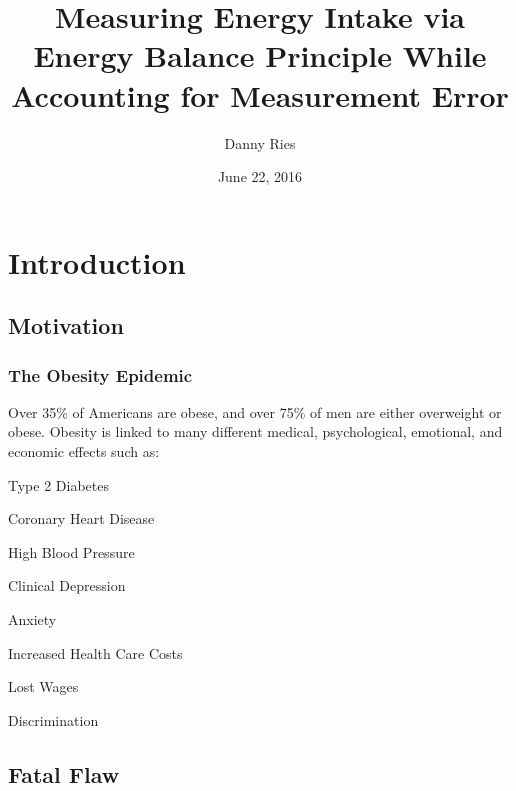 \documentclass[handout]{beamer}\usepackage[]{graphicx}\usepackage[]{color}
\title{Measuring Energy Intake via Energy Balance Principle While Accounting for Measurement Error}
\author[Danny Ries]{Danny Ries}
\institute[Iowa State]{Iowa State University}
\date{June 22, 2016}
\begin{document}







\frame{\maketitle}

\section{Introduction}
\subsection{Motivation}
\begin{frame}
\frametitle{The Obesity Epidemic}

Over 35\% of Americans are obese, and over  75\% of men are either overweight or obese. Obesity is linked to many different medical, psychological, emotional, and economic effects such as:
\begin{itemize}
\begin{multicols}{2}
\item
Type 2 Diabetes
\item
Coronary Heart Disease
\item
High Blood Pressure
\item 
Clinical Depression
\columnbreak
\item
Anxiety
\item 
Increased Health Care Costs
\item
Lost Wages
\item
Discrimination
\end{multicols}
\end{itemize}

\end{frame}




\subsection{Fatal Flaw}
\end{document}
